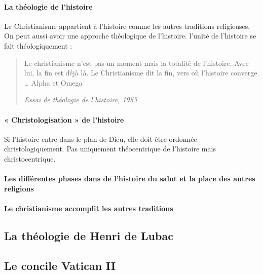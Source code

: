       \paragraph{La théologie de l'histoire} Le Christianisme appartient à l'histoire comme les autres traditions religieuses. On peut aussi avoir une approche théologique de l'histoire. l'unité de l'histoire se fait théologiquement : 
      \begin{quote}
      
      Le christianisme n’est pas un moment mais la totalité de l’histoire. Avec lui, la fin est déjà là. Le Christianisme dit la fin, vers où l’histoire converge. … Alpha et Omega



\textit{Essai de théologie de l'histoire, 1953}
      \end{quote}
      
     
      
      \paragraph{« Christologisation » de l'histoire}
      Si l’histoire entre dans le plan de Dieu, elle doit être ordonnée christologiquement. Pas uniquement théocentrique de l’histoire mais christocentrique. 
     
      
      \paragraph{Les différentes phases dans de l'histoire du salut et la place des
      autres religions}
      
     
      
      \paragraph{Le christianisme accomplit les autres traditions}
      
  
   
    
    \subsection{La théologie de Henri de Lubac}
    
   
    
    \subsection{Le concile Vatican II}
    

